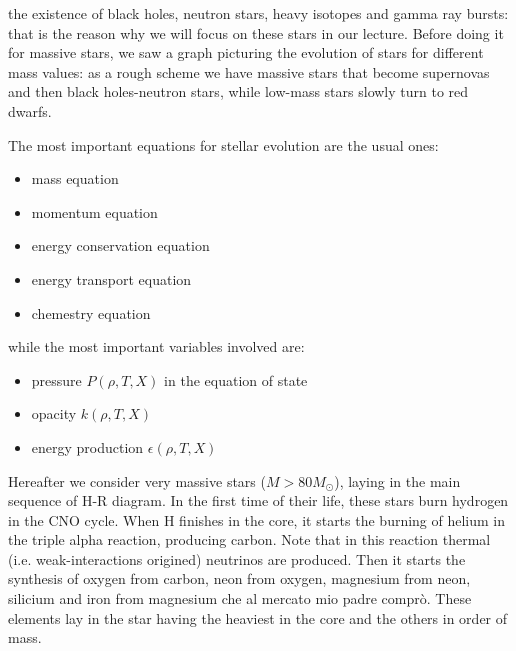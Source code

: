\documentclass[main.tex]{subfiles}
\begin{document}
the existence of black holes, neutron stars, heavy isotopes and gamma ray bursts: that is the reason why we will focus on these stars in our lecture.
Before doing it for massive stars, we saw a graph picturing the evolution of stars for different mass values: as a rough scheme we have massive stars that become supernovas and then black holes-neutron stars, while low-mass stars slowly turn to red dwarfs.

The most important equations for stellar evolution are the usual ones:
\begin{itemize}
    \item mass equation
    \item momentum equation
    \item energy conservation equation
    \item energy transport equation
    \item chemestry equation
\end{itemize}
%
while the most important variables involved are:
%
\begin{itemize}
    \item pressure $P(\rho,T,X)$ in the equation of state
    \item opacity $k(\rho,T,X)$
    \item energy production $\epsilon(\rho,T,X)$
\end{itemize}

Hereafter we consider very massive stars (\(M > 80 M_{\odot}\)), laying in the main sequence of H-R diagram. In the first time of their life, these stars burn hydrogen in the CNO cycle. When H finishes in the core, it starts the burning of helium in the triple alpha reaction, producing carbon. Note that in this reaction thermal (i.e. weak-interactions origined) neutrinos are produced.
Then it starts the synthesis of oxygen from carbon, neon from oxygen, magnesium from neon, silicium and iron from magnesium che al mercato mio padre comprò. These elements lay in the star having the heaviest in the core and the others in order of mass.
\end{document}

